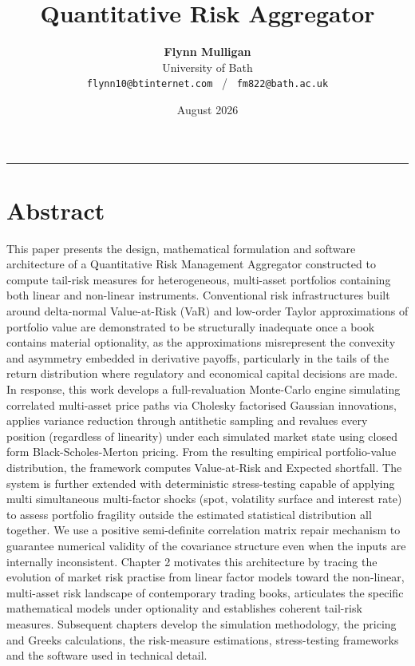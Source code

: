 \documentclass{article}
\title{\textbf{Quantitative Risk Aggregator}}
\author{
    \textbf{Flynn Mulligan} \\
    University of Bath \\
    \small \texttt{flynn10@btinternet.com} \ / \ \texttt{fm822@bath.ac.uk}
}
\date{August 2026}
\theoremstyle{plain}
\theoremstyle{definition}
\theoremstyle{remark}
\begin{document}
\maketitle

\vspace{1em}
\hrule
\vspace{1em}

\section{Abstract}
This paper presents the design, mathematical formulation and software architecture of a Quantitative Risk Management Aggregator constructed to compute tail-risk measures for heterogeneous, multi-asset portfolios containing both linear and non-linear instruments. Conventional risk infrastructures built around delta-normal Value-at-Risk (VaR) and low-order Taylor approximations of portfolio value are demonstrated to be structurally inadequate once a book contains material optionality, as the approximations misrepresent the convexity and asymmetry embedded in derivative payoffs, particularly in the tails of the return distribution where regulatory and economical capital decisions are made. In response, this work develops a full-revaluation Monte-Carlo engine simulating correlated multi-asset price paths via Cholesky factorised Gaussian innovations, applies variance reduction through antithetic sampling and revalues every position (regardless of linearity) under each simulated market state using closed form Black-Scholes-Merton pricing. From the resulting empirical portfolio-value distribution, the framework computes Value-at-Risk and Expected shortfall. The system is further extended with deterministic stress-testing capable of applying multi simultaneous multi-factor shocks (spot, volatility surface and interest rate) to assess portfolio fragility outside the estimated statistical distribution all together. We use a positive semi-definite correlation matrix repair mechanism to guarantee numerical validity of the covariance structure even when the inputs are internally inconsistent. Chapter 2 motivates this architecture by tracing the evolution of market risk practise from linear factor models toward the non-linear, multi-asset risk landscape of contemporary trading books, articulates the specific mathematical models under optionality and establishes coherent tail-risk measures. Subsequent chapters develop the simulation methodology, the pricing and Greeks calculations, the risk-measure estimations, stress-testing frameworks and the software used in technical detail.
\end{document}

